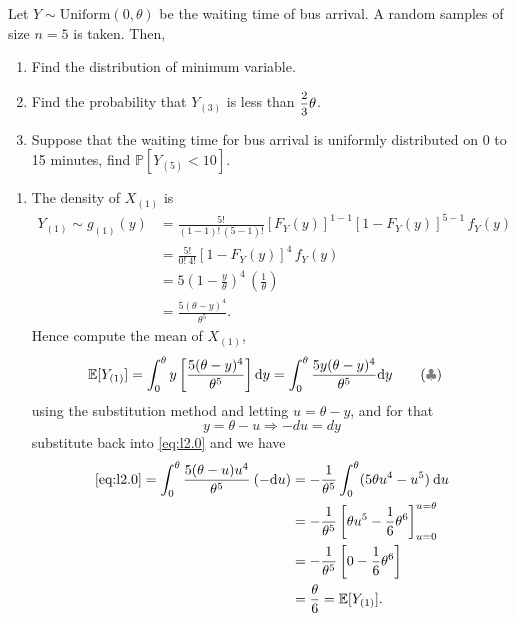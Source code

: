 \begin{example}
    Let $Y \sim \text{Uniform}(0, \theta)$ be the waiting time of bus arrival. A 
    random samples of size $n=5$ is taken. Then,
    \begin{enumerate}
        \item Find the distribution of minimum variable.
        \item Find the probability that $Y_{(3)}$ is less than $\mfrac{2}{3}\theta$.
        \item Suppose that the waiting time for bus arrival is uniformly distributed on 0 to 15 minutes, 
            find $\mathbb{P}[Y_{(5)} < 10]$.
    \end{enumerate}
\end{example}
\begin{solution}
    \begin{enumerate}
        \item The density of $X_{(1)}$ is
    \begin{align*}
        Y_{(1)} \sim g_{(1)}(y) &= \frac{5!}{(1-1)!\, (5-1)!} [F_Y(y)]^{1-1} [1 - F_Y(y)]^{5-1}\, f_Y(y)\\
        &= \frac{5!}{0!\> 4!}[1 - F_Y(y)]^4\, f_Y(y)\\
        &= 5 \left(1 - \frac{y}{\theta} \right)^4 \, \left(\frac{1}{\theta} \right)\\
        &= \frac{5(\theta - y)^4}{\theta^5}.
    \end{align*}
    Hence compute the mean of $X_{(1)}$, 
    \begin{align*}
        \mathbb{E}[Y_{(1)}] &= \int_{0}^{\theta} y\left[ \frac{5(\theta - y)^4}{\theta^5} \right] \mathrm{d}y =
        \int_{0}^{\theta} \frac{5y(\theta - y)^4}{\theta^5} \mathrm{d}y \label{eq:l2.0} \tag{{\color{gray} $\clubsuit$}}
    \end{align*}
    using the substitution method and letting $u = \theta - y$, and for that 
    \[
        y = \theta - u \Longrightarrow -du = dy
    \]
    substitute back into \eqref{eq:l2.0} and we have 
    \begin{align*}
        \eqref{eq:l2.0} = \int^\theta_0 \frac{5(\theta - u)u^4}{\theta^5}\> (-\mathrm{d}u)
        &= -\frac{1}{\theta^5} \int^\theta_0 (5\theta u^4 - u^5)\> \mathrm{d}u\\
        &= -\frac{1}{\theta^5} \left[ \theta u^5 - \frac{1}{6}\theta^6 \right]^{u=\theta}_{u=0}\\
        &= -\frac{1}{\theta^5} \left[ 0 - \frac{1}{6}\theta^6 \right]\\
        &= \frac{\theta}{6} = \mathbb{E}[Y_{(1)}].
    \end{align*}


\end{enumerate}
\end{solution}

